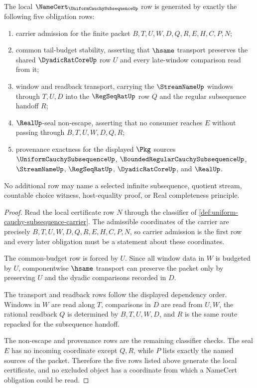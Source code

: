 \begin{theorem}
\label{thm:uniform-cauchy-subsequence-namecert-obligations}
The local $\NameCert_{\UniformCauchySubsequenceUp}$ row is generated by exactly the following five obligation rows:
\begin{enumerate}
\item carrier admission for the finite packet $B,T,U,W,D,Q,R,E,H,C,P,N$;
\item common tail-budget stability, asserting that $\hsame$ transport preserves the shared $\DyadicRatCoreUp$ row $U$ and every late-window comparison read from it;
\item window and readback transport, carrying the $\StreamNameUp$ windows through $T,U,D$ into the $\RegSeqRatUp$ row $Q$ and the regular subsequence handoff $R$;
\item $\RealUp$-seal non-escape, asserting that no consumer reaches $E$ without passing through $B,T,U,W,D,Q,R$;
\item provenance exactness for the displayed $\Pkg$ sources $\UniformCauchySubsequenceUp$, $\BoundedRegularCauchySubsequenceUp$, $\StreamNameUp$, $\RegSeqRatUp$, $\DyadicRatCoreUp$, and $\RealUp$.
\end{enumerate}
No additional row may name a selected infinite subsequence, quotient stream, countable choice witness, host-equality proof, or Real completeness principle.
\end{theorem}
\begin{proof}
Read the local certificate row $N$ through the classifier of \autoref{def:uniform-cauchy-subsequence-carrier}. The admissible coordinates of the carrier are precisely $B,T,U,W,D,Q,R,E,H,C,P,N$, so carrier admission is the first row and every later obligation must be a statement about these coordinates.

The common-budget row is forced by $U$. Since all window data in $W$ is budgeted by $U$, componentwise $\hsame$ transport can preserve the packet only by preserving $U$ and the dyadic comparisons recorded in $D$.

The transport and readback rows follow the displayed dependency order. Windows in $W$ are read along $T$, comparisons in $D$ are read from $U,W$, the rational readback $Q$ is determined by $B,T,U,W,D$, and $R$ is the same route repacked for the subsequence handoff.

The non-escape and provenance rows are the remaining classifier checks. The seal $E$ has no incoming coordinate except $Q,R$, while $P$ lists exactly the named sources of the packet. Therefore the five rows listed above generate the local certificate, and no excluded object has a coordinate from which a NameCert obligation could be read.
\end{proof}

